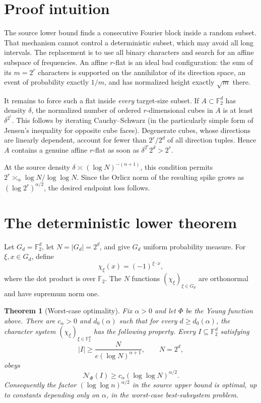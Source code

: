 \documentclass[11pt]{article}
\newtheorem{theorem}{Theorem}
\newcommand{\F}{\mathbb F}
\newcommand{\Nphi}{\mathcal N_{\Phi}}
\begin{document}
\section{Proof intuition}

The source lower bound finds a consecutive Fourier block inside a random
subset.  That mechanism cannot control a deterministic subset, which may
avoid all long intervals.  The replacement is to use all binary characters
and search for an affine subspace of frequencies.  An affine $r$-flat is an
ideal bad configuration: the sum of its $m=2^r$ characters is supported on
the annihilator of its direction space, an event of probability exactly
$1/m$, and has normalized height exactly $\sqrt m$ there.

It remains to force such a flat inside \emph{every} target-size subset.  If
$A\subset\F_2^d$ has density $\delta$, the normalized number of ordered
$r$-dimensional cubes in $A$ is at least $\delta^{2^r}$.  This follows by
iterating Cauchy--Schwarz (in the particularly simple form of Jensen's
inequality for opposite cube faces).  Degenerate cubes, whose directions are
linearly dependent, account for fewer than $2^r/2^d$ of all direction
tuples.  Hence $A$ contains a genuine affine $r$-flat as soon as
$\delta^{2^r}2^d>2^r$.

At the source density
$\delta\asymp(\log N)^{-(\alpha+1)}$, this condition permits
$2^r\asymp_\alpha\log N/\log\log N$.  Since the Orlicz norm of the resulting
spike grows as $(\log 2^r)^{\alpha/2}$, the desired endpoint loss follows.

\section{The deterministic lower theorem}

Let $G_d=\F_2^d$, let $N=|G_d|=2^d$, and give $G_d$ uniform probability
measure.  For $\xi,x\in G_d$, define
\[
 \chi_\xi(x)=(-1)^{\xi\cdot x},
\]
where the dot product is over $\F_2$.  The $N$ functions
$(\chi_\xi)_{\xi\in G_d}$ are orthonormal and have supremum norm one.

\begin{theorem}[Worst-case optimality]\label{thm:main}
Fix $\alpha>0$ and let $\Phi$ be the Young function above.  There are
$c_\alpha>0$ and $d_0(\alpha)$ such that for every $d\ge d_0(\alpha)$,
the character system $(\chi_\xi)_{\xi\in\F_2^d}$ has the following
property.  Every $I\subseteq\F_2^d$ satisfying
\[
 |I|\ge \frac{N}{e(\log N)^{\alpha+1}},
 \qquad N=2^d,
\]
obeys
\[
 \Nphi(I)\ge c_\alpha(\log\log N)^{\alpha/2}.
\]
Consequently the factor $(\log\log n)^{\alpha/2}$ in the source upper
bound is optimal, up to constants depending only on $\alpha$, in the
worst-case best-subsystem problem.
\end{theorem}
\end{document}
